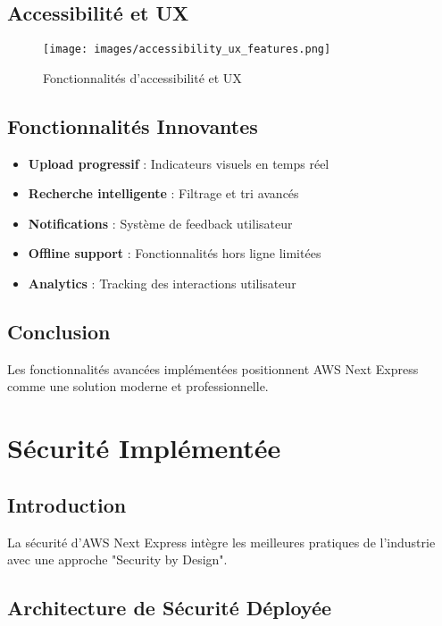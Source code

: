 \begin{table}[H]
\begin{table}[H]
\begin{table}[H]
\subsection{Accessibilité et UX}

\begin{figure}[H]
    \centering
    \texttt{[image: images/accessibility\_ux\_features.png]}
    \caption{Fonctionnalités d'accessibilité et UX}
    \label{fig:accessibility}
\end{figure}

\subsection{Fonctionnalités Innovantes}

\begin{itemize}
    \item \textbf{Upload progressif} : Indicateurs visuels en temps réel
    \item \textbf{Recherche intelligente} : Filtrage et tri avancés
    \item \textbf{Notifications} : Système de feedback utilisateur
    \item \textbf{Offline support} : Fonctionnalités hors ligne limitées
    \item \textbf{Analytics} : Tracking des interactions utilisateur
\end{itemize}

\subsection{Conclusion}

Les fonctionnalités avancées implémentées positionnent AWS Next Express comme une solution moderne et professionnelle.

\section{Sécurité Implémentée}

\subsection{Introduction}

La sécurité d'AWS Next Express intègre les meilleures pratiques de l'industrie avec une approche "Security by Design".

\subsection{Architecture de Sécurité Déployée}


\end{table}
\end{table}
\end{table}
